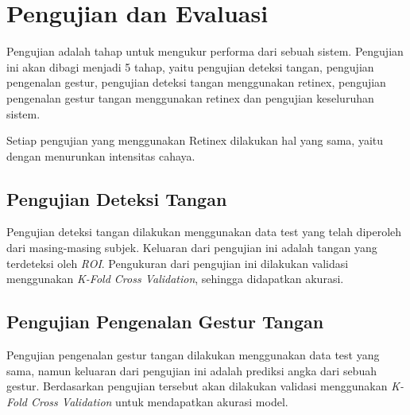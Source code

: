 \section{Pengujian dan Evaluasi}
Pengujian adalah tahap untuk mengukur performa dari sebuah sistem. Pengujian ini akan dibagi menjadi 5 tahap, yaitu pengujian deteksi tangan, pengujian pengenalan gestur, pengujian deteksi tangan menggunakan retinex, pengujian pengenalan gestur tangan menggunakan retinex dan pengujian keseluruhan sistem. 

Setiap pengujian yang menggunakan Retinex dilakukan hal yang sama, yaitu dengan menurunkan intensitas cahaya.
\subsection{Pengujian Deteksi Tangan}
Pengujian deteksi tangan dilakukan menggunakan data test yang telah diperoleh dari masing-masing subjek. Keluaran dari pengujian ini adalah tangan yang terdeteksi oleh \emph{ROI}. Pengukuran dari pengujian ini dilakukan validasi menggunakan \emph{K-Fold Cross Validation}, sehingga didapatkan akurasi.
\subsection{Pengujian Pengenalan Gestur Tangan}
Pengujian pengenalan gestur tangan dilakukan menggunakan data test yang sama, namun keluaran dari pengujian ini adalah prediksi angka dari sebuah gestur. Berdasarkan pengujian tersebut akan dilakukan validasi menggunakan \emph{K-Fold Cross Validation} untuk mendapatkan akurasi model.

